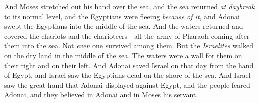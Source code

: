 \begin{biblechapter}
\verse And Moses stretched out his hand over the sea, and the sea returned \textit{at daybreak} to its normal level, and the Egyptians were fleeing \textit{because of it}, and Adonai swept the Egyptians into the middle of the sea.
\verse And the waters returned and covered the chariots and the charioteers—all the army of Pharaoh coming after them into the sea. Not \textit{even} one survived among them.
\verse But the \textit{Israelites} walked on the dry land in the middle of the sea. The waters were a wall for them on their right and on their left.
\verse And Adonai saved Israel on that day from the hand of Egypt, and Israel saw the Egyptians dead on the shore of the sea.
\verse And Israel saw the great hand that Adonai displayed against Egypt, and the people feared Adonai, and they believed in Adonai and in Moses his servant.
\end{biblechapter}

